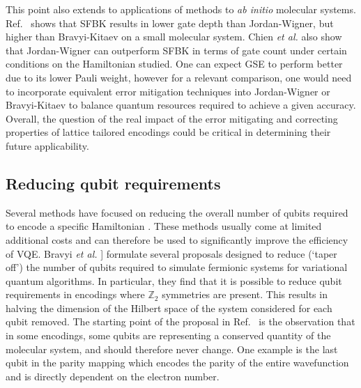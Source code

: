 This point also extends to applications of methods to \textit{ab initio} molecular systems. Ref.~\cite{Setia2018} shows that SFBK results in lower gate depth than Jordan-Wigner, but higher than Bravyi-Kitaev on a small molecular system. Chien \textit{et al.} \cite{Chien2019} also show that Jordan-Wigner can outperform SFBK in terms of gate count under certain conditions on the Hamiltonian studied. One can expect GSE to perform better due to its lower Pauli weight, however for a relevant comparison, one would need to incorporate equivalent error mitigation techniques into Jordan-Wigner or Bravyi-Kitaev to balance quantum resources required to achieve a given accuracy. Overall, the question of the real impact of the error mitigating and correcting properties of lattice tailored encodings could be critical in determining their future applicability. 

\subsection{Reducing qubit requirements} \label{sec:tappering_qubits}

Several methods have focused on reducing the overall number of qubits required to encode a specific Hamiltonian \cite{Moll2016, bravyi_tapering_2017, Steudtner2018, Setia2020, Kirby2021_CSVQE}. These methods usually come at limited additional costs and can therefore be used to significantly improve the efficiency of VQE. Bravyi {\it et al.} \cite{bravyi_tapering_2017}] formulate several proposals designed to reduce (`taper off') the number of qubits required to simulate fermionic systems for variational quantum algorithms. In particular, they find that it is possible to reduce qubit requirements in encodings where $\mathbb{Z}_2$ symmetries are present. This results in halving the dimension of the Hilbert space of the system considered for each qubit removed. The starting point of the proposal in Ref.~\cite{bravyi_tapering_2017} is the observation that in some encodings, some qubits are representing a conserved quantity of the molecular system, and should therefore never change. One example is the last qubit in the parity mapping which encodes the parity of the entire wavefunction and is directly dependent on the electron number.

